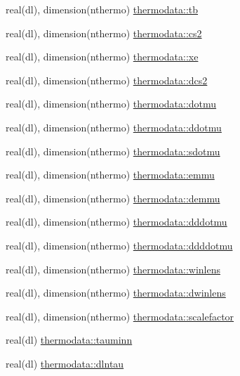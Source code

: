 \begin{DoxyCompactItemize}
\item 
real(dl), dimension(nthermo) \mbox{\hyperlink{namespacethermodata_ab667ebbdbb18924a862b09a4b328c7f2}{thermodata\+::tb}}
\item 
real(dl), dimension(nthermo) \mbox{\hyperlink{namespacethermodata_abdbeec54177b30f0e0c16f4915bb6963}{thermodata\+::cs2}}
\item 
real(dl), dimension(nthermo) \mbox{\hyperlink{namespacethermodata_a253c9b40af269388f742a8651d063c18}{thermodata\+::xe}}
\item 
real(dl), dimension(nthermo) \mbox{\hyperlink{namespacethermodata_aca5f831d6371c97e07b745a1335c43a6}{thermodata\+::dcs2}}
\item 
real(dl), dimension(nthermo) \mbox{\hyperlink{namespacethermodata_aa46effcfaebc414efc1483613c20938b}{thermodata\+::dotmu}}
\item 
real(dl), dimension(nthermo) \mbox{\hyperlink{namespacethermodata_a64db577ccef33cb28a8ef97b9c49df58}{thermodata\+::ddotmu}}
\item 
real(dl), dimension(nthermo) \mbox{\hyperlink{namespacethermodata_a31169ba47074359a9820a44600d7628b}{thermodata\+::sdotmu}}
\item 
real(dl), dimension(nthermo) \mbox{\hyperlink{namespacethermodata_ad1bfdfc33182cbe1182c4785d88011c2}{thermodata\+::emmu}}
\item 
real(dl), dimension(nthermo) \mbox{\hyperlink{namespacethermodata_a01e420c8859c753a39ea78e4afe151a4}{thermodata\+::demmu}}
\item 
real(dl), dimension(nthermo) \mbox{\hyperlink{namespacethermodata_ad781349a01ad4eff9227f42ed5c67362}{thermodata\+::dddotmu}}
\item 
real(dl), dimension(nthermo) \mbox{\hyperlink{namespacethermodata_a679a88090aed732261c9ca690eddfe2b}{thermodata\+::ddddotmu}}
\item 
real(dl), dimension(nthermo) \mbox{\hyperlink{namespacethermodata_af11b78439f1e2243328bb5c4b111af76}{thermodata\+::winlens}}
\item 
real(dl), dimension(nthermo) \mbox{\hyperlink{namespacethermodata_a52362e5ab75ec6515f8b1b142b69ed8a}{thermodata\+::dwinlens}}
\item 
real(dl), dimension(nthermo) \mbox{\hyperlink{namespacethermodata_a6f460accce66697aeae2188276198cdb}{thermodata\+::scalefactor}}
\item 
real(dl) \mbox{\hyperlink{namespacethermodata_a68569d7c6ff02b02a4025f86a42c0d7e}{thermodata\+::tauminn}}
\item 
real(dl) \mbox{\hyperlink{namespacethermodata_a9a43caa2003542f5a28e6f2280515365}{thermodata\+::dlntau}}

\end{DoxyCompactItemize}
